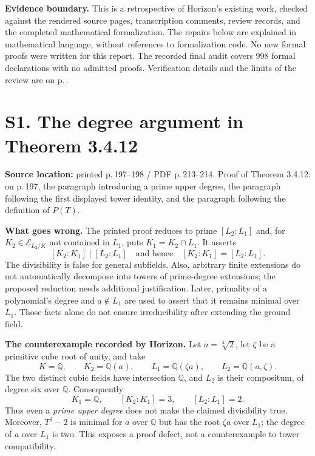 \documentclass[10pt,a4paper]{article}
\newcommand{\loc}[2]{\textbf{Source location:} printed p.\,#1 / PDF p.\,#2.}
\newcommand{\Q}{\mathbb Q}
\newcommand{\E}{\mathscr E}
\begin{document}
\textbf{Evidence boundary.} This is a retrospective of Horizon's existing work,
checked against the rendered source pages, transcription comments, review records,
and the completed mathematical formalization. The repairs below are explained
in mathematical language, without references to formalization code.
No new formal proofs were written for this report.
The recorded final audit covers 998 formal declarations with no admitted
proofs. Verification details and the limits of the review are on
p.\,\pageref{evidence}.

\newpage
\section{S1. The degree argument in Theorem 3.4.12}\label{s1}
\loc{197--198}{213--214}
Proof of Theorem 3.4.12: on p.\,197, the paragraph introducing a prime
upper degree, the paragraph following the first displayed tower identity,
and the paragraph following the definition of $P(T)$.

\textbf{What goes wrong.} The printed proof reduces to prime
$[L_2:L_1]$ and, for $K_2\in\E_{L_2/K}$ not contained in $L_1$, puts
$K_1=K_2\cap L_1$. It asserts
\[
[K_2:K_1]\mid [L_2:L_1]
\quad\text{and hence}\quad [K_2:K_1]=[L_2:L_1].
\]
The divisibility is false for general subfields. Also, arbitrary finite
extensions do not automatically decompose into towers of prime-degree
extensions; the proposed reduction needs additional justification. Later,
primality of a polynomial's degree and $a\notin L_1$ are used to assert
that it remains minimal over $L_1$. Those facts alone do not ensure
irreducibility after extending the ground field.

\textbf{The counterexample recorded by Horizon.} Let $a=\sqrt[3]{2}$,
let $\zeta$ be a primitive cube root of unity, and take
\[
 K=\Q,\qquad K_2=\Q(a),\qquad L_1=\Q(\zeta a),\qquad
 L_2=\Q(a,\zeta).
\]
The two distinct cubic fields have intersection $\Q$, and $L_2$ is their
compositum, of degree six over $\Q$. Consequently
\[
 K_1=\Q,\qquad [K_2:K_1]=3,\qquad [L_2:L_1]=2.
\]
Thus even a \emph{prime upper degree} does not make the claimed divisibility
true. Moreover, $T^3-2$ is minimal for $a$ over $\Q$ but has the root
$\zeta a$ over $L_1$; the degree of $a$ over $L_1$ is two.
This exposes a proof defect, not a counterexample to tower compatibility.
\end{document}
